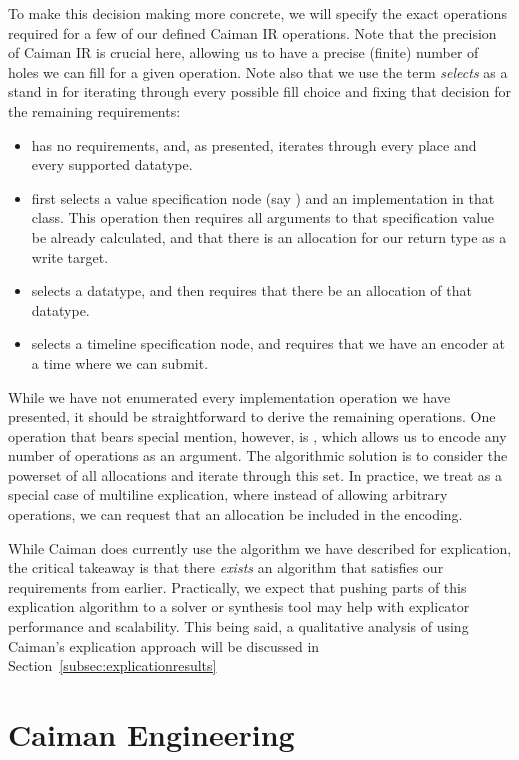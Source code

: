To make this decision making more concrete, we will specify the exact operations required for a few of our defined Caiman IR operations.  Note that the precision of Caiman IR is crucial here, allowing us to have a precise (finite) number of holes we can fill for a given operation.  Note also that we use the term \emph{selects} as a stand in for iterating through every possible fill choice and fixing that decision for the remaining requirements:
\begin{itemize}
\item {} has no requirements, and, as presented, iterates through every place and every supported datatype.
\item {} first selects a value specification node (say ) and an implementation in that class.  This operation then requires all arguments to that specification value be already calculated, and that there is an allocation for our return type as a write target.
\item {} selects a datatype, and then requires that there be an allocation of that datatype.
\item {} selects a timeline specification node, and requires that we have an encoder at a time where we can submit.
\end{itemize}
While we have not enumerated every implementation operation we have presented, it should be straightforward to derive the remaining operations.  One operation that bears special mention, however, is , which allows us to encode any number of operations as an argument.  The algorithmic solution is to consider the powerset of all allocations and iterate through this set.  In practice, we treat  as a special case of multiline explication, where instead of allowing arbitrary operations, we can request that an allocation be included in the encoding.

While Caiman does currently use the algorithm we have described for explication, the critical takeaway is that there \emph{exists} an algorithm that satisfies our requirements from earlier.  Practically, we expect that pushing parts of this explication algorithm to a solver or synthesis tool may help with explicator performance and scalability.  This being said, a qualitative analysis of using Caiman's explication approach will be discussed in Section~\ref{subsec:explicationresults}

\section{Caiman Engineering}
\label{sec:engineering}

